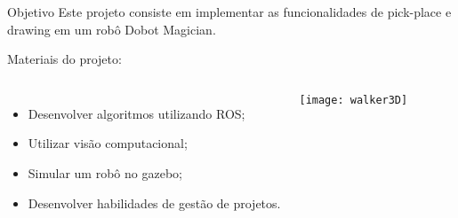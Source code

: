 \begin{frame}[c]{} 
   
    \begin{center}
    \end{center}
       
\end{frame}
%
\begin{frame}[t]{Objetivo} 
    Este projeto consiste em implementar as funcionalidades de pick-place e drawing em um robô Dobot Magician.
    \vspace*{0.3cm}

    Materiais do projeto:
        \begin{columns}[c]
                \begin{itemize}
                    \item Desenvolver algoritmos utilizando ROS;
                    \item Utilizar visão computacional;
                    \item Simular um robô no gazebo;
                    \item Desenvolver habilidades de gestão de projetos.
                \end{itemize}
                \texttt{[image: walker3D]}
        \end{columns}

\end{frame}

